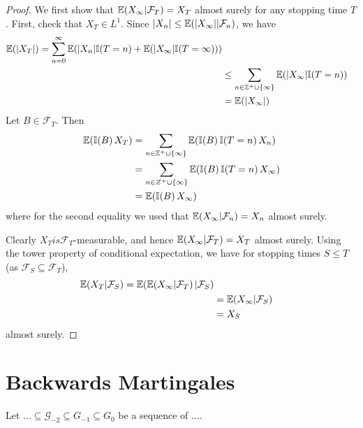 \begin{proof}
  We first show that $\E{X_{\infty} | \mathcal{F}_{T}} = X_{T}$ almost
  surely for any stopping time $T$.  First, check that $X_{T} \in
  L^{1}$. Since $|X_{n}| \leq \E{|X_{\infty}| | \mathcal{F}_{n}}$, we
  have
  \begin{align}
    \label{eq:46}
    \E{|X_{T}|}= \sum_{n=0}^{\infty} \E{|X_{n}|\I{T=n} +
      \E{|X_{\infty}| \I{T = \infty}}} \\
    &\leq \sum_{n \in \Z^{+} \cup \{ \infty \}} \E{|X_{\infty}|
      \I{T=n}} \\
    &= \E{|X_{\infty}|}
  \end{align}  Let $B \in \mathcal{F}_{T}$. Then
  \begin{align}
    \label{eq:48}
    \E{\I{B} X_{T}} &= \sum_{n \in \Z^{+} \cup \{ \infty \}} \E{\I{B}
      \I{T=n} X_{n}} \\
    &= \sum_{n \in Z^{+} \cup \{ \infty \}} \E{\I{B} \I{T =n}
      X_{\infty}} \\
    &= \E{\I{B} X_{\infty}}
  \end{align} where for the second equality we used that
  $\E{X_{\infty} | \mathcal{F}_{n}} = X_{n}$ almost surely.

  Clearly $X_{T} is \mathcal{F}_{T}$-measurable, and hence
  $\E{X_{\infty} | \mathcal{F}_{T}} = X_{T}$ almost surely.  Using the
  tower property of conditional expectation, we have for stopping
  times $S \leq T$ (as $\mathcal{F}_{S} \subseteq \mathcal{F}_{T}$),
  \begin{align}
    \label{eq:49}
    \E{X_{T} | \mathcal{F}_{S}} = \E{\E{X_{\infty} | \mathcal{F}_{T}}
      | \mathcal{F}_{S}} \\
    &= \E{X_{\infty} | \mathcal{F}_{S}} \\
    &= X_{S}
  \end{align} almost surely.
\end{proof}

\section{Backwards Martingales}
\label{sec:backw-mart}

Let $... \subseteq \mathcal{G}_{-2} \subseteq G_{-1} \subseteq G_{0}$
be a sequence of $...$.



